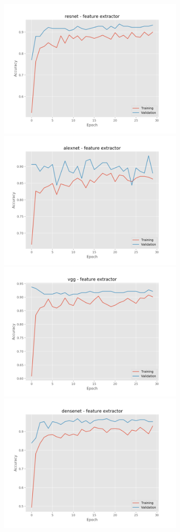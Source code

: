 \documentclass[]{kththesis}
\begin{document}
  \begin{figure}[h]
    \includegraphics[width=9cm]{r_a_resnet_fe}
    \includegraphics[width=9cm]{r_a_alexnet_fe}
    \includegraphics[width=9cm]{r_a_vgg_fe}
    \includegraphics[width=9cm]{r_a_densenet_fe}

\end{figure}
\end{document}
